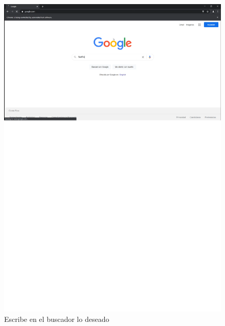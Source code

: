 \documentclass[conference]{IEEEtran}
\begin{document}
\begin{figure}[H]
\centering
\includegraphics[scale=0.47]{imagenes/5buscanetflix.pdf}
\caption{Escribe en el buscador lo deseado}
\end{figure}
\end{document}

